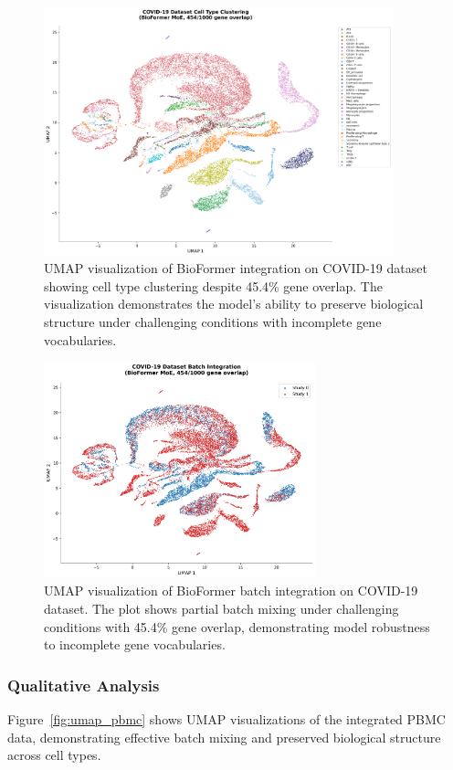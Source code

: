 \begin{figure}[h]
\centering
\includegraphics[width=0.9\textwidth]{figures/umap_moe_covid-19_scientific.png}
\caption{UMAP visualization of BioFormer integration on COVID-19 dataset showing cell type clustering despite 45.4\% gene overlap. The visualization demonstrates the model's ability to preserve biological structure under challenging conditions with incomplete gene vocabularies.}
\label{fig:umap_covid_celltype}
\end{figure}

\begin{figure}[h]
\centering
\includegraphics[width=0.7\textwidth]{figures/umap_moe_covid-19_batch_scientific.png}
\caption{UMAP visualization of BioFormer batch integration on COVID-19 dataset. The plot shows partial batch mixing under challenging conditions with 45.4\% gene overlap, demonstrating model robustness to incomplete gene vocabularies.}
\label{fig:umap_covid_batch}
\end{figure}

\subsubsection{Qualitative Analysis}
Figure~\ref{fig:umap_pbmc} shows UMAP visualizations of the integrated PBMC data, demonstrating effective batch mixing and preserved biological structure across cell types.

